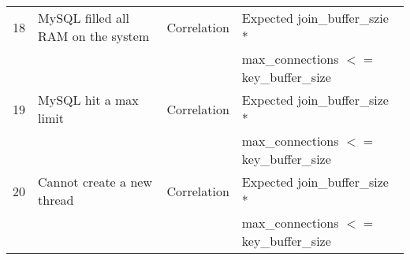 \begin{table*}[tbp]
\begin{footnotesize}
\begin{tabular}{|l|l|l|l|}
18 & MySQL filled all RAM on the system
& Correlation
& Expected join\_buffer\_szie * \\ & && max\_connections $<=$ key\_buffer\_size \\ \hline


19 & MySQL hit a max limit
& Correlation
& Expected join\_buffer\_size * \\ &&& max\_connections $<=$ key\_buffer\_size \\ \hline

20 & Cannot create a new thread
& Correlation
& Expected join\_buffer\_size * \\ &&& max\_connections $<=$ key\_buffer\_size \\ \hline

\end{tabular}
\end{footnotesize}
\end{table*}


